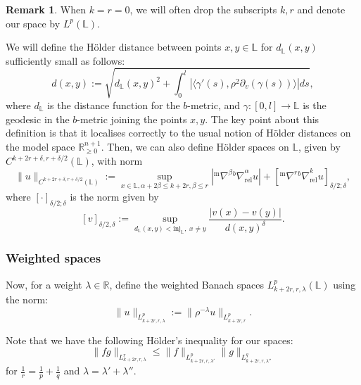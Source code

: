 \documentclass[10pt, a4paper]{article}
\theoremstyle{plain}%
\theoremstyle{definition}
\newtheorem{rem}[theorem]{Remark}
\numberwithin{figure}{section}
\numberwithin{equation}{section}
\newcommand{\bL}{\mathbb{L}}
\newcommand{\la}{\langle}
\newcommand{\ra}{\rangle}
\newcommand{\bR}{\mathbb{R}}
\newcommand{\pa}{\partial}
\newcommand{\rt}{\rightarrow}
\newcommand{\m}{\mathrm{m}}
\begin{document}
\begin{rem}
	When $k=r=0$, we will often drop the subscripts $k,r$ and denote our space by $L^p(\bL)$. 
\end{rem}

We will define the H\"{o}lder distance between points $x,y\in \bL$ for $d_\bL(x,y)$ sufficiently small as follows:\[
d(x,y) := \sqrt{d_{\bL}(x,y)^2+\int_0^l|\la\gamma'(s),\rho^2\pa_v(\gamma(s))\ra|ds },
\] 
where $d_{\bL}$ is the distance function for the $b$-metric, and $\gamma: [0,l]\rt \bL$ is the geodesic in the $b$-metric joining the points $x,y$. The key point about this definition is that it localises correctly to the usual notion of H\"{o}lder distances on the model space $\bR^{n+1}_{\geq 0}$. Then, we can also define H\"{o}lder spaces on $\mathbb{L}$, given by $C^{k+2r+\delta,r+\delta/2}(\mathbb{L})$, with norm\[
\|u\|_{C^{k+2r+\delta,r+\delta/2}(\mathbb{L})} := \sup_{x\in \mathbb{L}, \alpha + 2\beta \leq k+2r, \beta \leq r}|^{\m}\nabla^\beta{^b\nabla}_{\textrm{rel}}^\alpha u| + [^{\m}\nabla^r{^b\nabla}_{\textrm{rel}}^k u]_{\delta/2;\delta},
\]
where $[\cdot]_{\delta/2;\delta}$ is the norm given by \[
[v]_{\delta/2,\delta}:= \sup_{d_\bL(x,y)<\textrm{inj}_\bL, \; x \neq y}\frac{|v(x)-v(y)|}{d(x,y)^\delta}.
\]



\subsubsection{Weighted spaces}\label{subsubsec_weightedordinaryspaces}
Now, for a weight $\lambda \in \mathbb{R}$, define the weighted Banach spaces $L^p_{k+2r,r,\lambda}(\mathbb{L})$ using the norm: \[
\|u\|_{L^p_{k+2r,r,\lambda}}:= \|\rho^{-\lambda}u\|_{L^p_{k+2r,r}}.
\]

Note that we have the following H\"{o}lder's inequality for our spaces:\[
\|fg\|_{L^r_{k+2r,r,\lambda}} \leq \|f\|_{L^p_{k+2r,r,\lambda'}}\|g\|_{L^q_{k+2r,r,\lambda''}}
\]
for $\frac{1}{r}=\frac{1}{p}+\frac{1}{q}$ and $\lambda = \lambda'+\lambda''$. 
\end{document}
